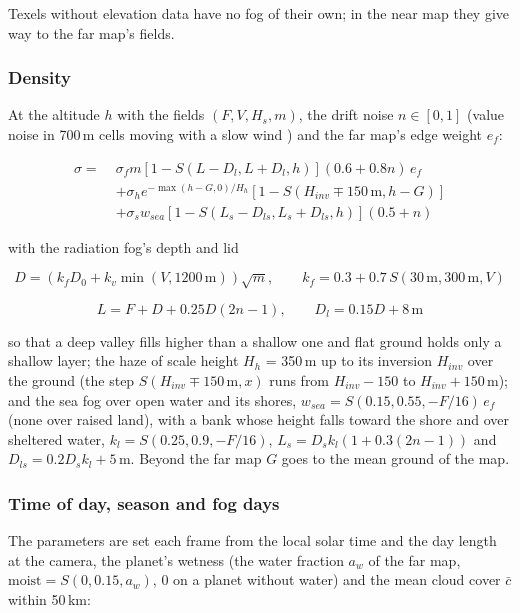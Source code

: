 \documentclass[Orbiter Technical Reference.tex]{subfiles}
\begin{document}
\begin{sloppypar}
\noindent
Texels without elevation data have no fog of their own; in the near map they give way to the far map's fields.

\subsubsection{Density}
At the altitude $h$ with the fields $(F, V, H_{s}, m)$, the drift noise $n \in [0, 1]$ (value noise in 700\,m cells moving with a slow wind \cite{teschner2003}) and the far map's edge weight $e_{f}$:

\begin{align*}
\sigma = \; & \sigma_{f} m\left[1 - S(L - D_{l}, L + D_{l}, h)\right](0.6 + 0.8n)\,e_{f} \\
& + \sigma_{h} e^{-\max(h - G, 0)/H_{h}}\left[1 - S(H_{inv} \mp 150\,\mathrm{m}, h - G)\right] \\
& + \sigma_{s} w_{sea}\left[1 - S(L_{s} - D_{ls}, L_{s} + D_{ls}, h)\right](0.5 + n)
\end{align*}

\noindent
with the radiation fog's depth and lid

\[ D = (k_{f}D_{0} + k_{v}\min(V, 1200\,\mathrm{m}))\sqrt{m}, \qquad k_{f} = 0.3 + 0.7\,S(30\,\mathrm{m}, 300\,\mathrm{m}, V) \]

\[ L = F + D + 0.25D(2n - 1), \qquad D_{l} = 0.15D + 8\,\mathrm{m} \]

\noindent
so that a deep valley fills higher than a shallow one and flat ground holds only a shallow layer; the haze of scale height $H_{h}$ = 350\,m up to its inversion $H_{inv}$ over the ground (the step $S(H_{inv} \mp 150\,\mathrm{m}, x)$ runs from $H_{inv} - 150$ to $H_{inv} + 150$\,m); and the sea fog over open water and its shores, $w_{sea} = S(0.15, 0.55, -F/16)\,e_{f}$ (none over raised land), with a bank whose height falls toward the shore and over sheltered water, $k_{l} = S(0.25, 0.9, -F/16)$, $L_{s} = D_{s}k_{l}(1 + 0.3(2n - 1))$ and $D_{ls} = 0.2D_{s}k_{l} + 5$\,m. Beyond the far map $G$ goes to the mean ground of the map.

\subsubsection{Time of day, season and fog days}
The parameters are set each frame from the local solar time and the day length at the camera, the planet's wetness (the water fraction $a_{w}$ of the far map, $\mathrm{moist} = S(0, 0.15, a_{w})$, 0 on a planet without water) and the mean cloud cover $\bar{c}$ within 50\,km:


\end{sloppypar}
\end{document}
